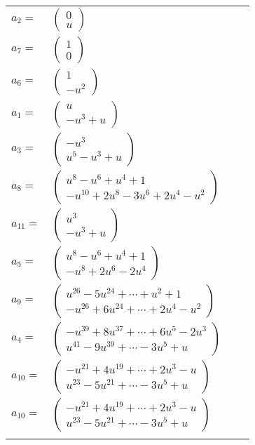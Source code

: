 \documentclass[1p]{elsarticle_modified}
\theoremstyle{definition}
\begin{document}
\begin{tabular}{m{7pt} m{180pt} m{7pt} m{180pt} }
\flushright $a_{2}=$&$\begin{pmatrix}0\\u\end{pmatrix}$ \\
\flushright $a_{7}=$&$\begin{pmatrix}1\\0\end{pmatrix}$ \\
\flushright $a_{6}=$&$\begin{pmatrix}1\\- u^2\end{pmatrix}$ \\
\flushright $a_{1}=$&$\begin{pmatrix}u\\- u^3+u\end{pmatrix}$ \\
\flushright $a_{3}=$&$\begin{pmatrix}- u^3\\u^5- u^3+u\end{pmatrix}$ \\
\flushright $a_{8}=$&$\begin{pmatrix}u^8- u^6+u^4+1\\- u^{10}+2 u^8-3 u^6+2 u^4- u^2\end{pmatrix}$ \\
\flushright $a_{11}=$&$\begin{pmatrix}u^3\\- u^3+u\end{pmatrix}$ \\
\flushright $a_{5}=$&$\begin{pmatrix}u^8- u^6+u^4+1\\- u^8+2 u^6-2 u^4\end{pmatrix}$ \\
\flushright $a_{9}=$&$\begin{pmatrix}u^{26}-5 u^{24}+\cdots+u^2+1\\- u^{26}+6 u^{24}+\cdots+2 u^4- u^2\end{pmatrix}$ \\
\flushright $a_{4}=$&$\begin{pmatrix}- u^{39}+8 u^{37}+\cdots+6 u^5-2 u^3\\u^{41}-9 u^{39}+\cdots-3 u^5+u\end{pmatrix}$ \\
\flushright $a_{10}=$&$\begin{pmatrix}- u^{21}+4 u^{19}+\cdots+2 u^3- u\\u^{23}-5 u^{21}+\cdots-3 u^5+u\end{pmatrix}$\\ \flushright $a_{10}=$&$\begin{pmatrix}- u^{21}+4 u^{19}+\cdots+2 u^3- u\\u^{23}-5 u^{21}+\cdots-3 u^5+u\end{pmatrix}$\\&\end{tabular}
\end{document}
